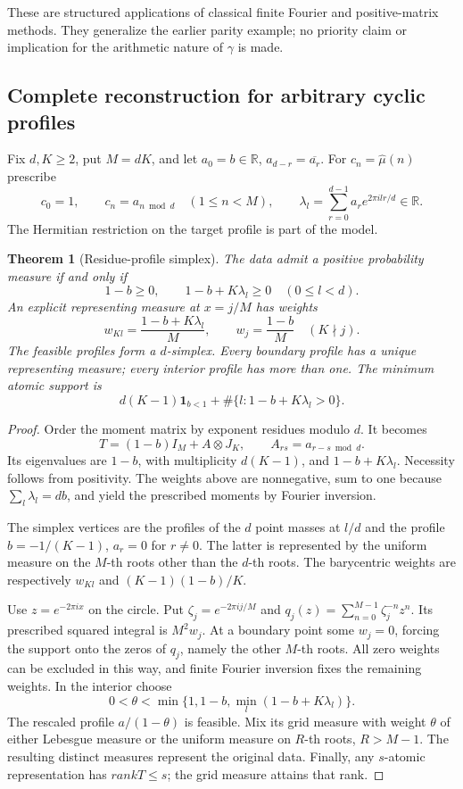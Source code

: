 \documentclass[11pt,a4paper]{article}
\newtheorem{theorem}{Theorem}[section]
\theoremstyle{definition}
\theoremstyle{remark}
\theoremstyle{plain}
\numberwithin{equation}{section}
\def\operatorname#1{#1}\def\mathrm#1{#1}}
\begin{document}
These are structured applications of classical finite Fourier and
positive-matrix methods. They generalize the earlier parity example;
no priority claim or implication for the arithmetic nature of $\gamma$
is made.

\subsection{Complete reconstruction for arbitrary cyclic profiles}
Fix $d,K\ge2$, put $M=dK$, and let
$a_0=b\in\mathbb R$, $a_{d-r}=\overline{a_r}$.
For $c_n=\widehat\mu(n)$ prescribe
\[
c_0=1,\qquad c_n=a_{n\bmod d}\quad(1\le n<M),
\qquad \lambda_l=\sum_{r=0}^{d-1}a_r e^{2\pi ilr/d}\in\mathbb R.
\]
The Hermitian restriction on the target profile is part of the model.

\begin{theorem}[Residue-profile simplex]\label{sc:thm:residue-simplex}
The data admit a positive probability measure if and only if
\begin{equation}\label{sc:eq:residue-feasible}
1-b\ge0,\qquad 1-b+K\lambda_l\ge0\quad(0\le l<d).
\end{equation}
An explicit representing measure at $x=j/M$ has weights
\[
w_{Kl}=\frac{1-b+K\lambda_l}{M},\qquad
w_j=\frac{1-b}{M}\quad(K\nmid j).
\]
The feasible profiles form a $d$-simplex. Every boundary profile has a
unique representing measure; every interior profile has more than one.
The minimum atomic support is
\[
d(K-1)\boldsymbol1_{b<1}
+\#\{l:1-b+K\lambda_l>0\}.
\]
\end{theorem}
\begin{proof}
Order the moment matrix by exponent residues modulo $d$. It becomes
\[
T=(1-b)I_M+A\otimes J_K,
\qquad A_{rs}=a_{r-s\bmod d}.
\]
Its eigenvalues are $1-b$, with multiplicity $d(K-1)$, and
$1-b+K\lambda_l$. Necessity follows from positivity. The weights
above are nonnegative, sum to one because $\sum_l\lambda_l=db$,
and yield the prescribed moments by Fourier inversion.

The simplex vertices are the profiles of the $d$ point masses at
$l/d$ and the profile $b=-1/(K-1)$, $a_r=0$ for $r\ne0$.
The latter is represented by the uniform measure on the $M$-th roots
other than the $d$-th roots. The barycentric weights are respectively
$w_{Kl}$ and $(K-1)(1-b)/K$.

Use $z=e^{-2\pi ix}$ on the circle. Put $\zeta_j=e^{-2\pi ij/M}$ and
$q_j(z)=\sum_{n=0}^{M-1}\zeta_j^{-n}z^n$.
Its prescribed squared integral is $M^2w_j$.
At a boundary point some $w_j=0$, forcing the support onto the
zeros of $q_j$, namely the other $M$-th roots. All zero weights can
be excluded in this way, and finite Fourier inversion fixes the
remaining weights. In the interior choose
\[
0<\theta<\min\{1,1-b,\min_l(1-b+K\lambda_l)\}.
\]
The rescaled profile $a/(1-\theta)$ is feasible. Mix its grid measure
with weight $\theta$ of either Lebesgue measure or the uniform measure
on $R$-th roots, $R>M-1$. The resulting distinct measures represent
the original data. Finally, any $s$-atomic representation has
$\operatorname{rank}T\le s$; the grid measure attains that rank.
\end{proof}
\end{document}
